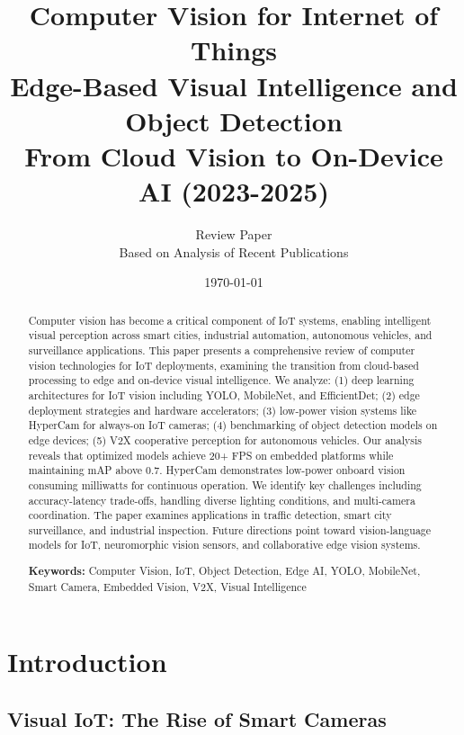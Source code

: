 \documentclass[12pt,a4paper]{article}
\title{
\vspace{-1cm}
{\Huge\bfseries Computer Vision for Internet of Things}\\[0.5cm]
{\Large Edge-Based Visual Intelligence and Object Detection}\\[0.3cm]
{\large From Cloud Vision to On-Device AI (2023-2025)}
}
\author{
\large Review Paper\\[0.2cm]
\normalsize Based on Analysis of Recent Publications
}
\date{\today}
\begin{document}
\maketitle
\thispagestyle{empty}

\begin{abstract}
\noindent
Computer vision has become a critical component of IoT systems, enabling intelligent visual perception across smart cities, industrial automation, autonomous vehicles, and surveillance applications. This paper presents a comprehensive review of computer vision technologies for IoT deployments, examining the transition from cloud-based processing to edge and on-device visual intelligence. We analyze: (1) deep learning architectures for IoT vision including YOLO, MobileNet, and EfficientDet; (2) edge deployment strategies and hardware accelerators; (3) low-power vision systems like HyperCam for always-on IoT cameras; (4) benchmarking of object detection models on edge devices; (5) V2X cooperative perception for autonomous vehicles. Our analysis reveals that optimized models achieve 20+ FPS on embedded platforms while maintaining mAP above 0.7. HyperCam demonstrates low-power onboard vision consuming milliwatts for continuous operation. We identify key challenges including accuracy-latency trade-offs, handling diverse lighting conditions, and multi-camera coordination. The paper examines applications in traffic detection, smart city surveillance, and industrial inspection. Future directions point toward vision-language models for IoT, neuromorphic vision sensors, and collaborative edge vision systems.

\vspace{0.3cm}
\noindent\textbf{Keywords:} Computer Vision, IoT, Object Detection, Edge AI, YOLO, MobileNet, Smart Camera, Embedded Vision, V2X, Visual Intelligence
\end{abstract}

\newpage
\tableofcontents
\newpage

\section{Introduction}

\subsection{Visual IoT: The Rise of Smart Cameras}
\end{document}
